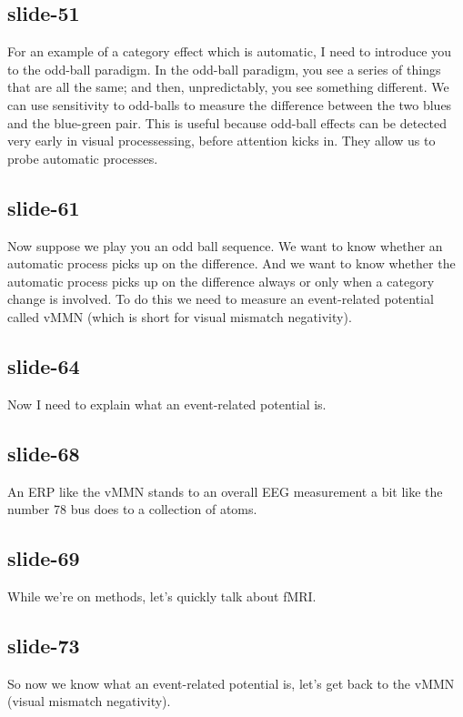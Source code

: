 \documentclass[12pt,\papersize]{extarticle}
\begin{document}
 
\subsection{slide-51}
For an example of a category effect which is automatic, I need to introduce you to the odd-ball paradigm.
In the odd-ball paradigm, you see a series of things that are all the same; and then, unpredictably, you see something different.
We can use sensitivity to odd-balls to measure the difference between the two blues and the blue-green pair.
This is useful because odd-ball effects can be detected very early in visual processessing, before attention kicks in.
They allow us to probe automatic processes.
 
 
\subsection{slide-61}
Now suppose we play you an odd ball sequence.
We want to know whether an automatic process picks up on the difference.
And we want to know whether the automatic process picks up on the difference always or only when a category change is involved.
To do this we need to measure an event-related potential called vMMN (which is short for visual mismatch negativity).
 
 
\subsection{slide-64}
Now I need to explain what an event-related potential is.
 
 
\subsection{slide-68}
An ERP like the vMMN stands to an overall EEG measurement a bit like the number 78 bus does to a collection of atoms.
 
 
\subsection{slide-69}
While we're on methods, let's quickly talk about fMRI.
 
 
\subsection{slide-73}
So now we know what an event-related potential is, let's get back to the vMMN (visual mismatch negativity).
 
 
\end{document}

